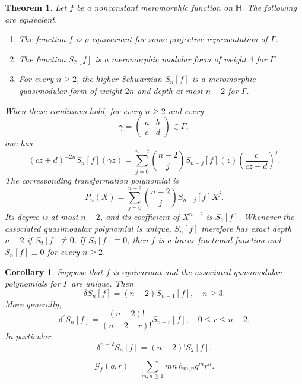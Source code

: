 \documentclass[10pt,a4paper]{amsart}
\newtheorem{thm}{Theorem}
\newtheorem{cor}{Corollary}
\begin{document}
\begin{thm}\label{thm:transformation-law}
Let \(f\) be a nonconstant meromorphic function on \(\mathbb H\). The following are equivalent.
\begin{enumerate}
\item The function \(f\) is \(\rho\)-equivariant for some projective representation of \(\Gamma\).
\item The function \(S_2[f]\) is a meromorphic modular form of weight \(4\) for \(\Gamma\).
\item For every \(n\geq2\), the higher Schwarzian \(S_n[f]\) is a meromorphic quasimodular form of weight \(2n\) and depth at most \(n-2\) for \(\Gamma\).
\end{enumerate}
When these conditions hold, for every \(n\geq2\) and every
\[
\gamma=
\begin{pmatrix}
a&b\\
c&d
\end{pmatrix}
\in\Gamma,
\]
one has
\begin{equation}\label{eq:universal-transformation}
(cz+d)^{-2n}S_n[f](\gamma z)
=
\sum_{j=0}^{n-2}\binom{n-2}{j}S_{n-j}[f](z)
\left(\frac{c}{cz+d}\right)^j.
\end{equation}
The corresponding transformation polynomial is
\[
P_n(X)
=
\sum_{j=0}^{n-2}\binom{n-2}{j}S_{n-j}[f]X^j.
\]
Its degree is at most \(n-2\), and its coefficient of \(X^{n-2}\) is \(S_2[f]\). Whenever the associated quasimodular polynomial is unique, \(S_n[f]\) therefore has exact depth \(n-2\) if \(S_2[f]\not\equiv0\). If \(S_2[f]\equiv0\), then \(f\) is a linear fractional function and \(S_n[f]\equiv0\) for every \(n\geq2\).
\end{thm}

\begin{cor}\label{cor:lowering}
Suppose that $f$ is equivariant and the associated quasimodular polynomials for $\Gamma$ are unique. Then
\begin{equation*}
\delta S_n[f]=(n-2)S_{n-1}[f],
\quad n\geq3.
\end{equation*}
More generally,
\begin{equation}\label{eq:delta-iterate}
\delta^rS_n[f]
=
\frac{(n-2)!}{(n-2-r)!}S_{n-r}[f],
\quad 0\leq r\leq n-2.
\end{equation}
In particular,
\[
\delta^{n-2}S_n[f]=(n-2)!S_2[f].
\]
\end{cor}

\begin{equation}\label{eq:grunsky-kernel-expansion}
\mathcal G_f(q,r)
=
\sum_{m,n\geq1}mn\,h_{m,n}q^mr^n.
\end{equation}
\end{document}
